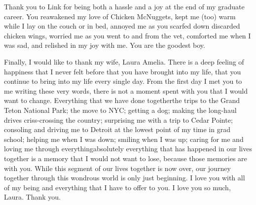 \begin{acknowledge}
Thank you to Link for being both a hassle and a joy at the end of my
graduate career. You reawakened my love of Chicken McNuggets, kept me
(too) warm while I lay on the couch or in bed, annoyed me as you scarfed
down discarded chicken wings, worried me as you went to and from the
vet, comforted me when I was sad, and relished in my joy with me. You
are the goodest boy.

Finally, I would like to thank my wife, Laura Amelia. There is a deep
feeling of happiness that I never felt before that you have brought into
my life, that you continue to bring into my life every single day. From
the first day I met you to me writing these very words, there is not a
moment spent with you that I would want to change. Everything that we
have done together\textemdash{}the trips to the Grand Teton National
Park; the move to NYC; getting a dog; making the long-haul drives
criss-crossing the country; surprising me with a trip to Cedar Pointe;
consoling and driving me to Detroit at the lowest point of my time in
grad school; helping me when I was down; smiling when I was up; caring
for me and loving me through everything\textemdash{}absolutely
everything that has happened in our lives together is a memory that I
would not want to lose, because those memories are with you. While this
segment of our lives together is now over, our journey together through
this wondrous world is only just beginning. I love you with all of my
being and everything that I have to offer to you. I love you so much,
Laura. Thank you.

\end{acknowledge}
